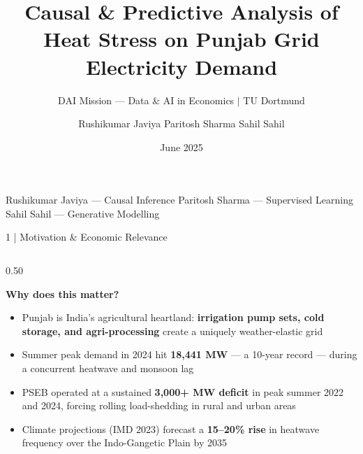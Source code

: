 \documentclass[aspectratio=169, 10pt]{beamer}
\title[Heat Stress \& Punjab Grid Demand]{Causal \& Predictive Analysis of\\
Heat Stress on Punjab Grid Electricity Demand}
\subtitle{DAI Mission — Data \& AI in Economics $\mid$ TU Dortmund}
\author{%
  Rushikumar Javiya \textbullet{} Paritosh Sharma \textbullet{} Sahil Sahil}
\institute{TU Dortmund — Group P}
\date{June 2025}
\begin{document}
\begin{frame}[plain]
  \titlepage
  \vspace{-1em}
  \centering
  \footnotesize
  \textcolor{white!70!gray}{%
    Rushikumar Javiya — Causal Inference \quad
    Paritosh Sharma — Supervised Learning \quad
    Sahil Sahil — Generative Modelling}
\end{frame}

\begin{frame}{1 \;|\; Motivation \& Economic Relevance}

\begin{columns}[T]
\begin{column}{0.50\textwidth}

\textbf{Why does this matter?}
\begin{itemize}
  \item Punjab is India's agricultural heartland: \textbf{irrigation pump sets, cold
        storage, and agri-processing} create a uniquely weather-elastic grid
  \item Summer peak demand in 2024 hit \textbf{18,441 MW} — a 10-year record —
        during a concurrent heatwave and monsoon lag
  \item PSEB operated at a sustained \textbf{3,000+ MW deficit} in peak summer
        2022 and 2024, forcing rolling load-shedding in rural and urban areas
  \item Climate projections (IMD 2023) forecast a \textbf{15–20\% rise} in
        heatwave frequency over the Indo-Gangetic Plain by 2035
\end{itemize}



\end{column}
\end{columns}
\end{frame}
\end{document}
